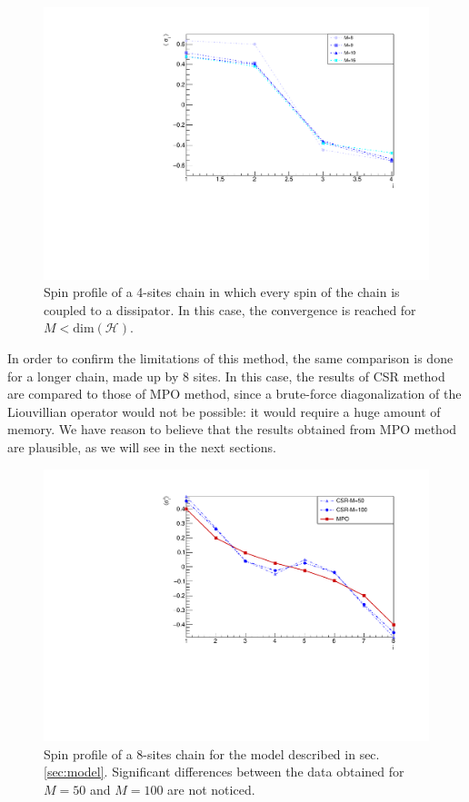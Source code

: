 \begin{figure}[H]
    \centering
    \includegraphics[scale=0.7]{Figures/4sites/4sites_totalDissipators.pdf}
    \captionsetup{width=1.\linewidth}
    \caption{Spin profile of a 4-sites chain in which every spin of the chain is coupled to a dissipator. In this case, the convergence is reached for $M<\text{dim}(\mathcal{H})$.}
    \label{fig:4sites_totalDissipators}
\end{figure}

In order to confirm the limitations of this method, the same comparison is done for a longer chain, made up by 8 sites. In this case, the results of CSR method are compared to those of MPO method, since a brute-force diagonalization of the Liouvillian operator would not be possible: it would require a huge amount of memory. We have reason to believe that the results obtained from MPO method are plausible, as we will see in the next sections.

\begin{figure}[H]
    \centering
    \includegraphics[scale=0.7]{Figures/8sites/1U1D_comparisonCSR_MPO_8site.pdf}
    \captionsetup{width=1.\linewidth}
    \caption{Spin profile of a 8-sites chain for the model described in sec.\ref{sec:model}. Significant differences between the data obtained for $M=50$ and $M=100$ are not noticed.}
    \label{fig:1U1D_comparisonCSR_MPO_8site}
\end{figure}

